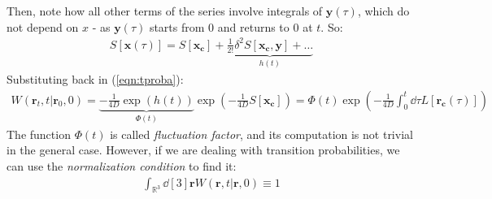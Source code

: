 \documentclass[../template.tex]{subfiles}
\begin{document}
Then, note how all other terms of the series involve integrals of $\bm{y}(\tau)$, which do not depend on $x$ - as $\bm{y}(\tau)$ starts from $0$ and returns to $0$ at $t$. So:
\begin{align*}
    S[\bm{x}(\tau)] = S[\bm{x_c}] + \underbrace{\frac{1}{2!} \delta^2 S[\bm{x_c},\bm{y}] + \dots}_{h(t)} 
\end{align*} 
Substituting back in (\ref{eqn:tproba}):
\begin{align*}
    W(\bm{r}_t, t|\bm{r}_0, 0) = \underbrace{-\frac{1}{4D} \exp(h(t))}_{\Phi(t)} \exp(-\frac{1}{4D} S[\bm{x_c}]) = \Phi(t) \exp\left(-\frac{1}{4D} \int_0^t \dd{\tau} L[\bm{r_c}(\tau)] \right)
\end{align*}
The function $\Phi(t)$ is called \textit{fluctuation factor}, and its computation is not trivial in the general case. However, if we are dealing with transition probabilities, we can use the \textit{normalization condition} to find it:
\begin{align*}
    \int_{\mathbb{R}^3} \dd[3]{\bm{r}} W(\bm{r},t|\bm{r},0) \equiv 1
\end{align*} 
\end{document}
